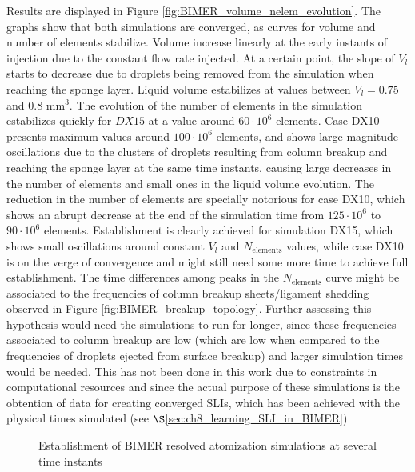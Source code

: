 Results are displayed in Figure \ref{fig:BIMER_volume_nelem_evolution}. The graphs show that both simulations are converged, as curves for volume and number of elements stabilize. Volume increase linearly at the early instants of injection due to the constant flow rate injected. At a certain point, the slope of $V_l$ starts to decrease due to droplets being removed from the simulation when reaching the sponge layer. Liquid volume estabilizes at values between $V_l = 0.75$ and $0.8$ mm$^3$. The evolution of the number of elements in the simulation estabilizes quickly for $DX15$ at a value around $60 \cdot 10^6$ elements. Case DX10 presents maximum values around $100 \cdot 10^6$ elements, and shows large magnitude oscillations due to the clusters of droplets resulting from column breakup and reaching the sponge layer at the same time instants, causing large decreases in the number of elements and small ones in the liquid volume evolution. The reduction in the number of elements are specially notorious for case DX10, which shows an abrupt decrease at the end of the simulation time from $125 \cdot 10^6$ to $90 \cdot 10^6$ elements. Establishment is clearly achieved for simulation DX15, which shows small oscillations around constant $V_l$ and $N_\mathrm{elements}$ values, while case DX10 is on the verge of convergence and might still need some more time to achieve full establishment. The time differences among peaks in the $N_\mathrm{elements}$ curve might be associated to the frequencies of column breakup sheets/ligament shedding observed in Figure \ref{fig:BIMER_breakup_topology}. Further assessing this hypothesis would need the simulations to run for longer, since these frequencies associated to column breakup are low (which are low when compared to the frequencies of droplets ejected from surface breakup) and larger simulation times would be needed. This has not been done in this work due to constraints in computational resources and since the actual purpose of these simulations is the obtention of data for creating converged SLIs, which has been achieved with the physical times simulated (see $\S$\ref{sec:ch8_learning_SLI_in_BIMER})

\clearpage

\begin{figure}[ht]
\centering
{}
\caption{Establishment of BIMER resolved atomization simulations at several time instants}
\label{fig:BIMER_jet_establishment}
\end{figure}

